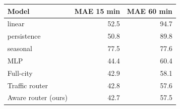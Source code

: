 \begin{tabular}{lrr}
\toprule
Model & MAE 15 min & MAE 60 min \\
\midrule
linear & 52.5 & 94.7 \\
persistence & 50.8 & 89.8 \\
seasonal & 77.5 & 77.6 \\
MLP & 44.4 & 60.4 \\
\midrule
Full-city & 42.9 & 58.1 \\
Traffic router & 42.8 & 57.6 \\
Aware router (ours) & 42.7 & 57.5 \\
\bottomrule
\end{tabular}
